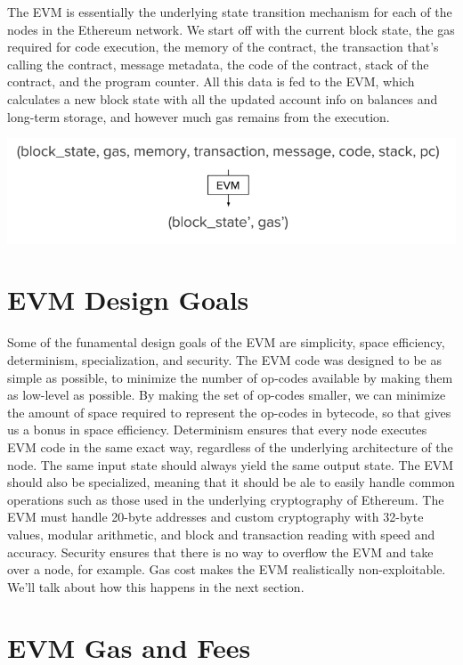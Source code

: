 \documentclass[full.tex]{subfiles}
\begin{document}
    The EVM is essentially the underlying state transition mechanism for each of the nodes in the Ethereum network. We start off with the current block state, the gas required for code execution, the memory of the contract, the transaction that's calling the contract, message metadata, the code of the contract, stack of the contract, and the program counter. All this data is fed to the EVM, which calculates a new block state with all the updated account info on balances and long-term storage, and however much gas remains from the execution. 
    
    \begin{center}
        \includegraphics[scale=0.5]{evm_transition}
    \end{center}
    
    \section*{EVM Design Goals}
    
    Some of the funamental design goals of the EVM are simplicity, space efficiency, determinism, specialization, and security. The EVM code was designed to be as simple as possible, to minimize the number of op-codes available by making them as low-level as possible. By making the set of op-codes smaller, we can minimize the amount of space required to represent the op-codes in bytecode, so that gives us a bonus in space efficiency. Determinism ensures that every node executes EVM code in the same exact way, regardless of the underlying architecture of the node. The same input state should always yield the same output state. The EVM should also be specialized, meaning that it should be ale to easily handle common operations such as those used in the underlying cryptography of Ethereum. The EVM must handle 20-byte addresses and custom cryptography with 32-byte values, modular arithmetic, and block and transaction reading with speed and accuracy. Security ensures that there is no way to overflow the EVM and take over a node, for example. Gas cost makes the EVM realistically non-exploitable. We'll talk about how this happens in the next section.
    
    \section*{EVM Gas and Fees}
    
\end{document}
